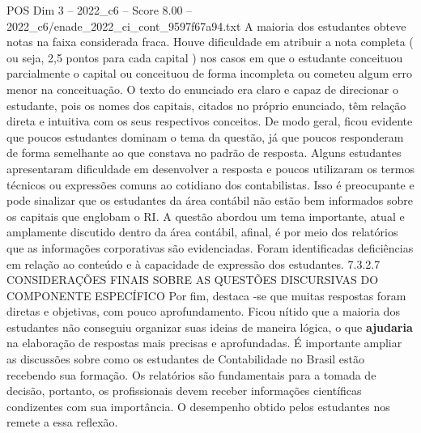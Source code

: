 \begin{textsample}{POS Dim 3 – 2022\_c6 – Score 8.00 – 2022\_c6/enade\_2022\_ci\_cont\_9597f67a94.txt}
A maioria dos estudantes obteve notas na faixa considerada fraca.
Houve dificuldade em atribuir a nota completa ( ou seja, 2,5 pontos para cada capital ) nos casos em que o estudante conceituou parcialmente o capital ou conceituou de forma incompleta ou cometeu algum erro menor na conceituação.
O texto do enunciado era claro e capaz de direcionar o estudante, pois os nomes dos capitais, citados no próprio enunciado, têm relação direta e intuitiva com os seus respectivos conceitos.
De modo geral, ficou evidente que poucos estudantes dominam o tema da questão, já que poucos responderam de forma semelhante ao que constava no padrão de resposta.
Alguns estudantes apresentaram dificuldade em desenvolver a resposta e poucos utilizaram os termos técnicos ou expressões comuns ao cotidiano dos contabilistas.
Isso é preocupante e pode sinalizar que os estudantes da área contábil não estão bem informados sobre os capitais que englobam o RI.
A questão abordou um tema importante, atual e amplamente discutido dentro da área contábil, afinal, é por meio dos relatórios que as informações corporativas são evidenciadas.
Foram identificadas deficiências em relação ao conteúdo e à capacidade de expressão dos estudantes. 7.3.2.7 CONSIDERAÇÕES FINAIS SOBRE AS QUESTÕES DISCURSIVAS DO COMPONENTE ESPECÍFICO Por fim, destaca -se que muitas respostas foram diretas e objetivas, com pouco aprofundamento.
Ficou nítido que a maioria dos estudantes não conseguiu organizar suas ideias de maneira lógica, o que \textbf{ajudaria} na elaboração de respostas mais precisas e aprofundadas.
É importante ampliar as discussões sobre como os estudantes de Contabilidade no Brasil estão recebendo sua formação.
Os relatórios são fundamentais para a tomada de decisão, portanto, os profissionais devem receber informações científicas condizentes com sua importância.
O desempenho obtido pelos estudantes nos remete a essa reflexão.

\end{textsample}
